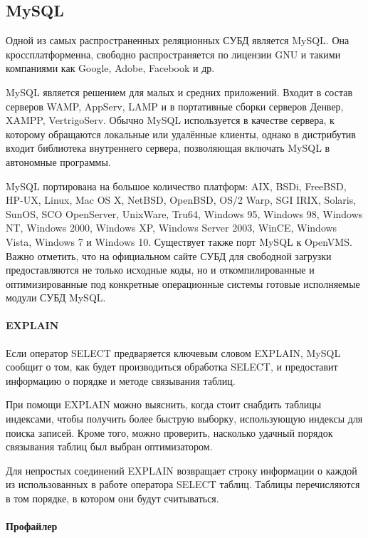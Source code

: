 \subsection{MySQL}

Одной из самых распространенных реляционных СУБД является MySQL. Она кроссплатформенна, свободно распространяется по лицензии GNU и такими компаниями как Google, Adobe, Facebook и др. \cite{article:tsiganov}

MySQL является решением для малых и средних приложений. Входит в состав серверов WAMP, AppServ, LAMP и в портативные сборки серверов Денвер, XAMPP, VertrigoServ. Обычно MySQL используется в качестве сервера, к которому обращаются локальные или удалённые клиенты, однако в дистрибутив входит библиотека внутреннего сервера, позволяющая включать MySQL в автономные программы. 

MySQL портирована на большое количество платформ: AIX, BSDi, FreeBSD, HP-UX, Linux, Mac OS X, NetBSD, OpenBSD, OS/2 Warp, SGI IRIX, Solaris, SunOS, SCO OpenServer, UnixWare, Tru64, Windows 95, Windows 98, Windows NT, Windows 2000, Windows XP, Windows Server 2003, WinCE, Windows Vista, Windows 7 и Windows 10. Существует также порт MySQL к OpenVMS. Важно отметить, что на официальном сайте СУБД для свободной загрузки предоставляются не только исходные коды, но и откомпилированные и оптимизированные под конкретные операционные системы готовые исполняемые модули СУБД MySQL.\cite{wikipedia.org:mysql}



\paragraph{EXPLAIN}

Если оператор SELECT предваряется ключевым словом EXPLAIN, MySQL сообщит о том, как будет производиться обработка SELECT, и предоставит информацию о порядке и методе связывания таблиц.

При помощи EXPLAIN можно выяснить, когда стоит снабдить таблицы индексами, чтобы получить более быструю выборку, использующую индексы для поиска записей. Кроме того, можно проверить, насколько удачный порядок связывания таблиц был выбран оптимизатором. 

Для непростых соединений EXPLAIN возвращает строку информации о каждой из использованных в работе оператора SELECT таблиц. Таблицы перечисляются в том порядке, в котором они будут считываться. \cite{mysql.ru:EXPLAIN}

\paragraph{Профайлер}

